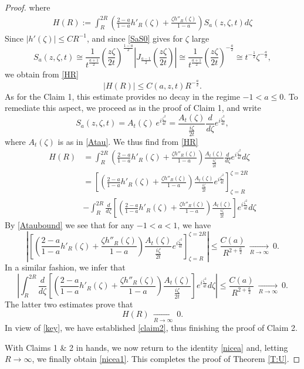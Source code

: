 \documentclass[11pt,letter]{amsart}
\numberwithin{equation}{section}
\numberwithin{equation}{section}
\begin{document}
\begin{proof}
where
\begin{align}\label{HR}
H(R) := \int_R^{2R} \left(\frac{2-a}{1-a}  h'_R(\zeta) + \frac{\zeta h''_R(\zeta)}{1-a} \right)  S_a(z,\zeta,t) d\zeta
\end{align}
Since $|h'(\zeta)|\le C R^{-1}$, and since \eqref{SaS0} gives for $\zeta$ large
\begin{equation}\label{SaS02}
S_a(z,\zeta,t) \cong 
\frac{1}{t^{\frac{a+1}2}}  \left(\frac{z\zeta}{2t}\right)^{\frac{1-a}2}\left|J_{\frac{a-1}2}(\frac{z\zeta}{2t})\right|\cong \frac{1}{t^{\frac{a+1}2}}  \left(\frac{z\zeta}{2t}\right)^{-\frac{a}2}\cong t^{-\frac 12} \zeta^{-\frac{a}2},
\end{equation}
we obtain from \eqref{HR}
\[
|H(R)| \le C(a,z,t) R^{-\frac a2}.
\]
As for the Claim 1, this estimate provides no decay in the regime $-1<a\le 0$. To remediate this aspect, we proceed as in the proof of Claim 1, and write 
\[
S_a(z,\zeta,t) = A_t(\zeta)\ e^{i \frac{\zeta^2}{4t}} = \frac{A_t(\zeta)}{\frac{i\zeta}{2t}}  \frac{d}{d\zeta} e^{i \frac{\zeta^2}{4t}},
\]
where $A_t(\zeta)$ is as in \eqref{Atau}. We thus find from \eqref{HR}
\begin{align*}
H(R) & = \int_R^{2R} \left(\frac{2-a}{1-a}  h'_R(\zeta) + \frac{\zeta h''_R(\zeta)}{1-a} \right) \frac{A_t(\zeta)}{\frac{i\zeta}{2t}}  \frac{d}{d\zeta} e^{i \frac{\zeta^2}{4t}} d\zeta
\\
& = \left[\left(\frac{2-a}{1-a}  h'_R(\zeta) + \frac{\zeta h''_R(\zeta)}{1-a} \right) \frac{A_t(\zeta)}{\frac{i\zeta}{2t}} e^{i \frac{\zeta^2}{4t}}\right]_{\zeta = R}^{\zeta = 2R}
\\
& - \int_R^{2R} \frac{d}{d\zeta} \left[\left(\frac{2-a}{1-a}  h'_R(\zeta) + \frac{\zeta h''_R(\zeta)}{1-a} \right) \frac{A_t(\zeta)}{\frac{i\zeta}{2t}}\right]  e^{i \frac{\zeta^2}{4t}} d\zeta
\end{align*}
By \eqref{Ataubound} we see that for any $-1<a<1$, we have
\[
\left|\left[\left(\frac{2-a}{1-a}  h'_R(\zeta) + \frac{\zeta h''_R(\zeta)}{1-a} \right) \frac{A_t(\zeta)}{\frac{i\zeta}{2t}} e^{i \frac{\zeta^2}{4t}}\right]_{\zeta = R}^{\zeta = 2R}\right| \le \frac{C(a)}{R^{2+\frac a2}}\ \underset{R\to \infty}{\longrightarrow}\ 0.
\]
In a similar fashion, we infer that 
\[
\left|\int_R^{2R} \frac{d}{d\zeta} \left[\left(\frac{2-a}{1-a}  h'_R(\zeta) + \frac{\zeta h''_R(\zeta)}{1-a} \right) \frac{A_t(\zeta)}{\frac{i\zeta}{2t}}\right]  e^{i \frac{\zeta^2}{4t}} d\zeta\right| \le \frac{C(a)}{R^{2+\frac a2}}\ \underset{R\to \infty}{\longrightarrow}\ 0.
\]
The latter two estimates prove that 
\[
H(R)\ \underset{R\to \infty}{\longrightarrow}\ 0.
\]
In view of \eqref{key}, we have established \eqref{claim2}, thus finishing the proof of Claim 2. 



\vskip 0.2in

With Claims 1 \& 2 in hands, we now return to the identity \eqref{nicea} and, letting $R\to \infty$, we finally obtain \eqref{nicea1}. This completes the proof of Theorem \ref{T:U}.

\end{proof}
\end{document}
